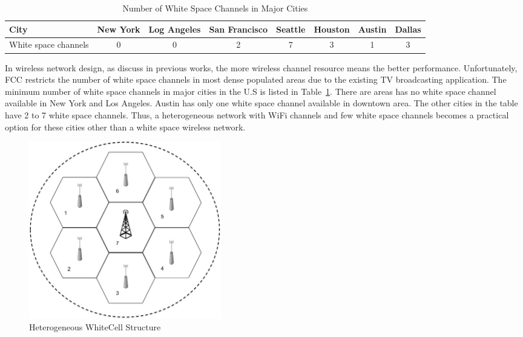 \begin{table}[hpt]
\centering %
\begin{tabular}{|l|c|c|c|c|c|c|c|} %
\hline %
City & New York & Log Angeles & San Francisco & Seattle & Houston & Austin & Dallas \\
\hline %
White space channels & 0 & 0 & 2 & 7 & 3 & 1& 3 \\
\hline %
\end{tabular}    
\caption{Number of White Space Channels in Major Cities} %
\label{tab:whitespacechannel}    
\vspace{-0.3in}
\end{table}    

In wireless network design, as discuss in previous works, the more wireless channel resource means the better 
performance.
Unfortunately, FCC restricts the number of white space channels in most dense populated areas due to the existing 
TV broadcasting application. The minimum number of white space channels in major cities in the U.S is listed in 
Table~\ref{tab:whitespacechannel}.
There are areas has no white space channel available in New York and Los Angeles. 
Austin has only one white space channel available in downtown area.
The other cities in the table have 2 to 7 white space channels.
Thus, a heterogeneous network with WiFi channels and few white space channels 
becomes a practical option for these cities other than a white space wireless network.



\begin{figure}
\vspace{-0.0in}
\centering
\includegraphics[width=84mm]{figures/whitecell}
\vspace{-0.1in}
\caption{Heterogeneous WhiteCell Structure}
\label{fig:systemmodel}
\vspace{-0.1in}
\end{figure}


